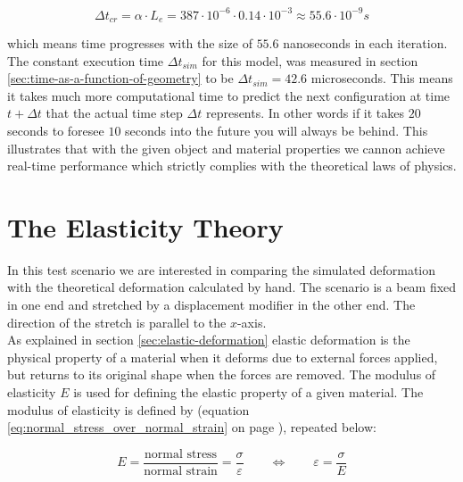 \begin{equation}
\Delta t_{cr} = \alpha \cdot L_e
= 387 \cdot 10^{-6}
\cdot 0.14 \cdot 10^{-3}
\approx 55.6 \cdot 10^{-9}s
\end{equation}

which means time progresses with the size of $55.6$ nanoseconds in
each iteration.
%
The constant execution time $\Delta t_{sim}$ for this model, was
measured in section \vref{sec:time-as-a-function-of-geometry} to be
$\Delta t_{sim}= 42.6$ microseconds. This means it takes much more
computational time to predict the next configuration at time $t +
\Delta t$ that the actual time step $\Delta t$ represents. In other
words if it takes $20$ seconds to foresee $10$ seconds into the future
you will always be behind. This illustrates that with the given object
and material properties we cannon achieve real-time performance which
strictly complies with the theoretical laws of physics.


\section{The Elasticity Theory}
\label{sec:results_elastic_theory}
In this test scenario we are interested in comparing the simulated
deformation with the theoretical deformation calculated
by hand. The scenario is a beam fixed in one end and stretched by a
displacement modifier in the other end. The direction of the stretch 
is parallel to the $x$-axis. \\

As explained in section \vref{sec:elastic-deformation} elastic
deformation is the physical 
property of a material when it 
deforms due to external forces applied, but returns to its original
shape when the forces are removed. The modulus of elasticity $E$ is used
for defining the elastic property of a given material. The modulus of
elasticity is defined by (equation
\ref{eq:normal_stress_over_normal_strain} on page
\pageref{eq:normal_stress_over_normal_strain}), repeated below:

\begin{equation*}
  E =  \frac{\mbox{normal stress}}{\mbox{normal strain}}
  = \frac{\sigma}{\varepsilon}
  \qquad \Leftrightarrow \qquad
  \varepsilon = \frac{\sigma}{E}
\end{equation*}

